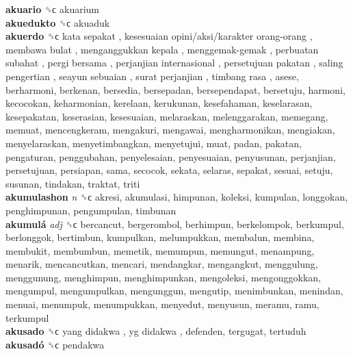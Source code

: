 \textbf{akuario} ␝ϲ  akuarium  \\
\textbf{akuedukto} ␝ϲ  akuaduk  \\
\textbf{akuerdo} ␝ϲ   kata sepakat ,  kesesuaian opini/aksi/karakter orang-orang ,  membawa bulat ,  menganggukkan kepala ,  menggemak-gemak ,  perbuatan subahat ,  pergi bersama ,  perjanjian internasional ,  persetujuan pakatan ,  saling pengertian ,  seayun sebuaian ,  surat perjanjian ,  timbang rasa , asese, berharmoni, berkenan, bersedia, bersepadan, bersependapat, bersetuju, harmoni, kecocokan, keharmonian, kerelaan, kerukunan, kesefahaman, keselarasan, kesepakatan, keserasian, kesesuaian, melaraskan, melenggarakan, memegang, memuat, mencengkeram, mengakuri, mengawai, mengharmonikan, mengiakan, menyelaraskan, menyetimbangkan, menyetujui, muat, padan, pakatan, pengaturan, penggubahan, penyelesaian, penyesuaian, penyusunan, perjanjian, persetujuan, persiapan, sama, secocok, sekata, selaras, sepakat, sesuai, setuju, susunan, tindakan, traktat, triti  \\
\textbf{akumulashon} \emph{n}  ␝ϲ  akresi, akumulasi, himpunan, koleksi, kumpulan, longgokan, penghimpunan, pengumpulan, timbunan  \\
\textbf{akumulá} \emph{adj}  ␝ϲ  bercancut, bergerombol, berhimpun, berkelompok, berkumpul, berlonggok, bertimbun, kumpulkan, melumpukkan, membalun, membina, membukit, membumbun, memetik, memumpun, memungut, menampung, menarik, mencancutkan, mencari, mendangkar, mengangkut, menggulung, menggunung, menghimpun, menghimpunkan, mengoleksi, mengonggokkan, mengumpul, mengumpulkan, mengunggun, mengutip, menimbunkan, menindan, menuai, menumpuk, menumpukkan, menyedut, menyusun, meramu, ramu, terkumpul  \\
\textbf{akusado} ␝ϲ   yang didakwa ,  yg didakwa , defenden, tergugat, tertuduh  \\
\textbf{akusadó} ␝ϲ  pendakwa  \\
